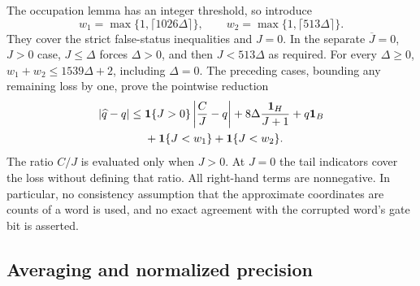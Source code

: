 The occupation lemma has an integer threshold, so introduce
\begin{equation}\label{eq:a-ceilings}
 w_1=\max\{1,\lceil1026\Delta\rceil\},\qquad
 w_2=\max\{1,\lceil513\Delta\rceil\}.
\end{equation}
They cover the strict false-status inequalities and $J=0$.
In the separate $\overline J=0$, $J>0$ case, $J\le\Delta$ forces
$\Delta>0$, and then $J<513\Delta$ as required.
For every $\Delta\ge0$,
$w_1+w_2\le1539\Delta+2$, including $\Delta=0$.
The preceding cases, bounding any remaining loss by one, prove the
pointwise reduction
\begin{equation}\label{eq:a-pathwise}
 \begin{split}
 |\widehat q-q|\le{}&
 \mathbf 1\{J>0\}\left|\frac CJ-q\right|
 +8\Delta\frac{\mathbf 1_H}{J+1}+q\mathbf 1_B\\
 &+\mathbf 1\{J<w_1\}+\mathbf 1\{J<w_2\}.
 \end{split}
\end{equation}
The ratio $C/J$ is evaluated only when $J>0$.  At $J=0$ the tail
indicators cover the loss without defining that ratio.  All right-hand
terms are nonnegative.  In particular, no consistency assumption that
the approximate coordinates are counts of a word is used, and no exact
agreement with the corrupted word's gate bit is asserted.

\subsection{Averaging and normalized precision}

